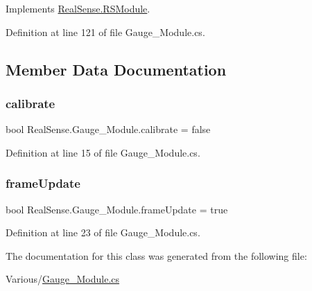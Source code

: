 Implements \hyperlink{class_real_sense_1_1_r_s_module_a2ec830b7932ee7c0077d473f81c73867}{Real\+Sense.\+R\+S\+Module}.



Definition at line 121 of file Gauge\+\_\+\+Module.\+cs.



\subsection{Member Data Documentation}
\mbox{\label{class_real_sense_1_1_gauge___module_a116882e1610b28a8ce6159b1ddbbf578}} 
\subsubsection{\texorpdfstring{calibrate}{calibrate}}
{\footnotesize\ttfamily bool Real\+Sense.\+Gauge\+\_\+\+Module.\+calibrate = false}



Definition at line 15 of file Gauge\+\_\+\+Module.\+cs.

\mbox{\label{class_real_sense_1_1_gauge___module_ae9d8d183234958600957fdfd23c4d850}} 
\subsubsection{\texorpdfstring{frame\+Update}{frameUpdate}}
{\footnotesize\ttfamily bool Real\+Sense.\+Gauge\+\_\+\+Module.\+frame\+Update = true}



Definition at line 23 of file Gauge\+\_\+\+Module.\+cs.



The documentation for this class was generated from the following file\+:\begin{DoxyCompactItemize}
\item 
Various/\hyperlink{_gauge___module_8cs}{Gauge\+\_\+\+Module.\+cs}\end{DoxyCompactItemize}
